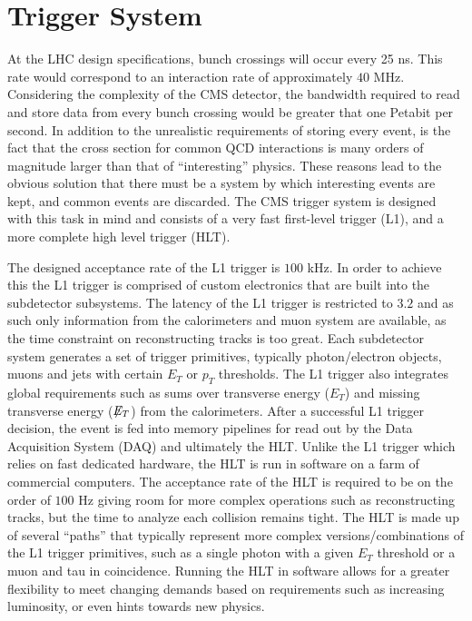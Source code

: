 \section{Trigger System}
\label{sec:triggersystem}
At the LHC design specifications, bunch crossings will occur every 25 ns. 
This rate would correspond to an interaction rate of approximately $40$ MHz.
Considering the complexity of the CMS detector, the bandwidth required to read and store data from every bunch crossing would be greater that one Petabit per second.
In addition to the unrealistic requirements of storing every event, is the fact that the cross section for common QCD interactions is many orders of magnitude larger than that of ``interesting'' physics.
These reasons lead to the obvious solution that there must be a system by which interesting events are kept, and common events are discarded.
The CMS trigger system is designed with this task in mind and consists of a very fast first-level trigger (L1), and a  more complete high level trigger (HLT).

The designed acceptance rate of the L1 trigger is $100$ kHz. 
In order to achieve this the L1 trigger is comprised of custom electronics that are built into the subdetector subsystems.
The latency of the L1 trigger is restricted to $3.2$  and as such only information from the calorimeters and muon system are available, as the time constraint on reconstructing tracks is too great.
Each subdetector system generates a set of trigger primitives, typically photon/electron objects, muons and jets with certain $E_{T}$ or $p_{T}$ thresholds.
The L1 trigger also integrates global requirements such as sums over transverse energy ($E_{T}$) and missing transverse energy ($\not\!\!{E}_{T}$) from the calorimeters.
After a successful L1 trigger decision, the event is fed into memory pipelines for read out by the Data Acquisition System (DAQ) and ultimately the HLT.
Unlike the L1 trigger which relies on fast dedicated hardware, the HLT is run in software on a farm of commercial computers.
The acceptance rate of the HLT is required to be on the order of $100$ Hz giving room for more complex operations such as reconstructing tracks, but the time to analyze each collision remains tight.
The HLT is made up of several ``paths'' that typically represent more complex versions/combinations of the L1 trigger primitives, such as a single photon with a given $E_{T}$ threshold or a muon and tau in coincidence.
Running the HLT in software allows for a greater flexibility to meet changing demands based on requirements such as increasing luminosity, or even hints towards new physics.

